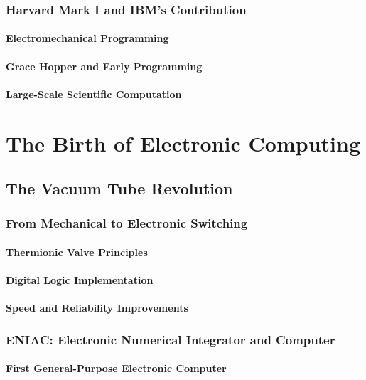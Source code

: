 \documentclass[12pt, oneside]{book}
\begin{document}
\subsection{Harvard Mark I and IBM's Contribution}
\subsubsection{Electromechanical Programming}
\subsubsection{Grace Hopper and Early Programming}
\subsubsection{Large-Scale Scientific Computation}


\chapter{The Birth of Electronic Computing}

\section{The Vacuum Tube Revolution}
\subsection{From Mechanical to Electronic Switching}
\subsubsection{Thermionic Valve Principles}
\subsubsection{Digital Logic Implementation}
\subsubsection{Speed and Reliability Improvements}

\subsection{ENIAC: Electronic Numerical Integrator and Computer}
\subsubsection{First General-Purpose Electronic Computer}
\end{document}

